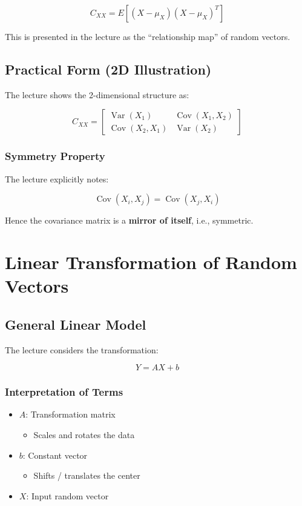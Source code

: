 \documentclass[12pt]{article}
\begin{document}
\[
C_{XX} = E\left[(X - \mu_X)(X - \mu_X)^T\right]
\]

This is presented in the lecture as the ``relationship map'' of random vectors.

\subsection{Practical Form (2D Illustration)}

The lecture shows the 2-dimensional structure as:

\[
C_{XX} =
\begin{bmatrix}
\operatorname{Var}(X_1) & \operatorname{Cov}(X_1, X_2) \\
\operatorname{Cov}(X_2, X_1) & \operatorname{Var}(X_2)
\end{bmatrix}
\]

\subsubsection*{Symmetry Property}

The lecture explicitly notes:

\[
\operatorname{Cov}(X_i, X_j) = \operatorname{Cov}(X_j, X_i)
\]

Hence the covariance matrix is a \textbf{mirror of itself}, i.e., symmetric.

\section{Linear Transformation of Random Vectors}

\subsection{General Linear Model}

The lecture considers the transformation:

\[
Y = AX + b
\]

\subsubsection*{Interpretation of Terms}

\begin{itemize}
    \item \(A\): Transformation matrix
    \begin{itemize}
        \item Scales and rotates the data
    \end{itemize}
    \item \(b\): Constant vector
    \begin{itemize}
        \item Shifts / translates the center
    \end{itemize}
    \item \(X\): Input random vector
\end{itemize}
\end{document}
